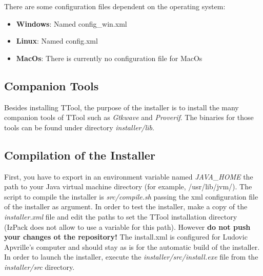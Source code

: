 \documentclass[12pt]{article}
\begin{document}
There are some configuration files dependent on the operating system:

\begin{itemize}
	\item \textbf{Windows}: Named config\_win.xml
	\item \textbf{Linux}: Named config.xml
	\item \textbf{MacOs}: There is currently no configuration file for MacOs
\end{itemize}

\subsection{Companion Tools}

Besides installing TTool, the purpose of the installer is to install the many
companion tools of TTool such as \emph{Gtkwave} and \emph{Proverif}. The
binaries for those tools can be found under directory \emph{installer/lib}.

\subsection{Compilation of the Installer}

First, you have to export in an environment variable named \emph{JAVA\_HOME} the
path to your Java virtual machine directory (for example, /usr/lib/jvm/). The
script to compile the installer is \emph{src/compile.sh} passing the xml
configuration file of the installer as argument. In order to test the installer,
make a copy of the \emph{installer.xml} file and edit the paths to set the TTool
installation directory (IzPack does not allow to use a variable for this path).
However \textbf{do not push your changes ot the repository!} The install.xml is
configured for Ludovic Apvrille's computer and should stay as is for the
automatic build of the installer. In order to launch the installer, execute the
\emph{installer/src/install.exe} file from the \emph{installer/src} directory.
\end{document}
